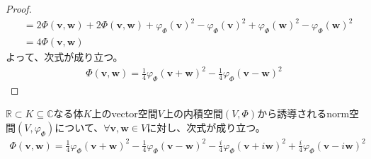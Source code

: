 \documentclass[dvipdfmx]{jsarticle}
\begin{document}
\begin{proof}
\begin{align*}
&= 2\varPhi\left( \mathbf{v},\mathbf{w} \right) + 2\varPhi\left( \mathbf{v},\mathbf{w} \right) + {\varphi_{\varPhi}\left( \mathbf{v} \right)}^{2} - {\varphi_{\varPhi}\left( \mathbf{v} \right)}^{2} + {\varphi_{\varPhi}\left( \mathbf{w} \right)}^{2} - {\varphi_{\varPhi}\left( \mathbf{w} \right)}^{2}\\
&= 4\varPhi\left( \mathbf{v},\mathbf{w} \right)
\end{align*}
よって、次式が成り立つ。
\begin{align*}
\varPhi\left( \mathbf{v},\mathbf{w} \right) = \frac{1}{4}{\varphi_{\varPhi}\left( \mathbf{v} + \mathbf{w} \right)}^{2} - \frac{1}{4}{\varphi_{\varPhi}\left( \mathbf{v} - \mathbf{w} \right)}^{2}
\end{align*}
\end{proof}
\begin{thm}\label{2.3.6.20}
$\mathbb{R} \subset K \subseteq \mathbb{C}$なる体$K$上のvector空間$V$上の内積空間$(V,\varPhi)$から誘導されるnorm空間$\left( V,\varphi_{\varPhi} \right)$について、$\forall\mathbf{v},\mathbf{w} \in V$に対し、次式が成り立つ。
\begin{align*}
\varPhi\left( \mathbf{v},\mathbf{w} \right) = \frac{1}{4}{\varphi_{\varPhi}\left( \mathbf{v} + \mathbf{w} \right)}^{2} - \frac{1}{4}{\varphi_{\varPhi}\left( \mathbf{v} - \mathbf{w} \right)}^{2} - \frac{i}{4}{\varphi_{\varPhi}\left( \mathbf{v} + i\mathbf{w} \right)}^{2} + \frac{i}{4}{\varphi_{\varPhi}\left( \mathbf{v} - i\mathbf{w} \right)}^{2}
\end{align*}
\end{thm}
\end{document}
